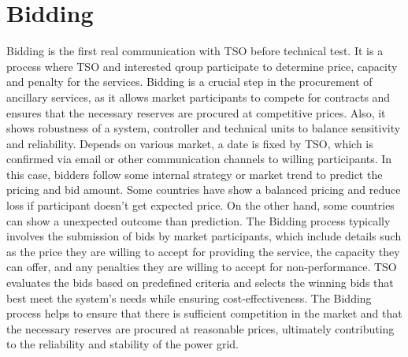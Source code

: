 \section{Bidding}
Bidding is the first real communication with TSO before technical test. It is a process where TSO and interested qroup participate to determine price, capacity and penalty for the services. Bidding is a crucial step in the procurement of ancillary services, as it allows market participants to compete for contracts and ensures that the necessary reserves are procured at competitive prices. Also, it shows robustness of a system, controller and technical units to balance sensitivity and reliability. Depends on various market, a date is fixed by TSO, which is confirmed via email or other communication channels to willing participants. In this case, bidders follow some internal strategy or market trend to predict the pricing and bid amount. Some countries have show a balanced pricing and reduce loss if participant doesn't get expected price. On the other hand, some countries can show a unexpected outcome than prediction. The Bidding process typically involves the submission of bids by market participants, which include details such as the price they are willing to accept for providing the service, the capacity they can offer, and any penalties they are willing to accept for non-performance. TSO evaluates the bids based on predefined criteria and selects the winning bids that best meet the system's needs while ensuring cost-effectiveness. The Bidding process helps to ensure that there is sufficient competition in the market and that the necessary reserves are procured at reasonable prices, ultimately contributing to the reliability and stability of the power grid.

\clearpage
